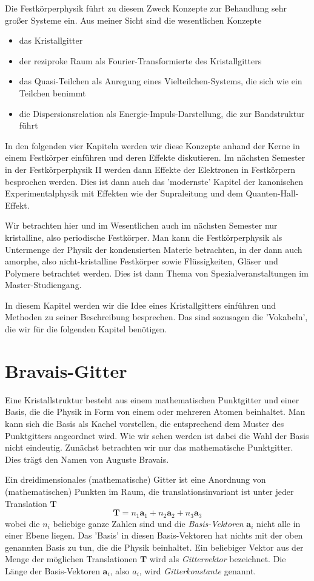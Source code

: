 Die Festkörperphysik führt zu diesem Zweck Konzepte zur Behandlung sehr großer Systeme ein. Aus meiner Sicht sind die wesentlichen Konzepte 
\begin{itemize} \setlength{\itemsep}{0pt}
\item das {Kristallgitter}
\item der {reziproke Raum} als Fourier-Transformierte des Kristallgitters
\item das Quasi-Teilchen als Anregung eines Vielteilchen-Systems, die sich wie ein Teilchen benimmt
\item die Dispersionsrelation als Energie-Impuls-Darstellung, die zur Bandstruktur führt
\end{itemize}
In den folgenden vier Kapiteln werden wir diese Konzepte anhand der Kerne in einem Festkörper einführen und deren Effekte diskutieren. Im nächsten Semester in der Festkörperphysik II werden dann Effekte der Elektronen in Festkörpern besprochen werden. Dies ist dann auch das 'modernste' Kapitel der kanonischen Experimentalphysik mit Effekten wie der Supraleitung und dem Quanten-Hall-Effekt.

Wir betrachten hier und im Wesentlichen auch im nächsten Semester nur kristalline, also periodische Festkörper. Man kann die Festkörperphysik als Untermenge der Physik der kondensierten Materie betrachten, in der dann auch amorphe, also nicht-kristalline Festkörper sowie Flüssigkeiten, Gläser und Polymere betrachtet werden. Dies ist dann Thema von Spezialveranstaltungen im Master-Studiengang. 

In diesem Kapitel werden wir die Idee eines Kristallgitters einführen und Methoden zu seiner Beschreibung besprechen. Das sind sozusagen die 'Vokabeln', die wir für die folgenden Kapitel benötigen.


\section{Bravais-Gitter}

Eine Kristallstruktur besteht aus einem mathematischen Punktgitter und einer Basis,  die die Physik in Form von einem oder mehreren Atomen beinhaltet. Man kann sich die Basis als Kachel vorstellen, die entsprechend dem Muster des Punktgitters angeordnet wird. Wie wir sehen werden ist dabei die Wahl der Basis nicht eindeutig. Zunächst betrachten wir nur das mathematische Punktgitter. Dies trägt den Namen von Auguste Bravais.

Ein dreidimensionales (mathematische) Gitter ist eine Anordnung von (mathematischen) Punkten im Raum, die translationsinvariant ist unter jeder Translation $\mathbf{T}$
\begin{equation}
 \mathbf{T} = n_1 \mathbf{a}_1 + n_2 \mathbf{a}_2 + n_3 \mathbf{a}_3  
\end{equation}
wobei die $n_i$ beliebige ganze Zahlen sind und die \emph{Basis-Vektoren} $\mathbf{a}_i$ nicht alle in einer Ebene liegen. Das 'Basis' in diesen Basis-Vektoren hat nichts mit der oben genannten Basis zu tun, die die Physik beinhaltet. Ein beliebiger Vektor aus der Menge der möglichen Translationen $\mathbf{T}$ wird als \emph{Gittervektor} bezeichnet. Die Länge der Basis-Vektoren   $\mathbf{a}_i$, also  $a_i$, wird \emph{Gitterkonstante} genannt.

